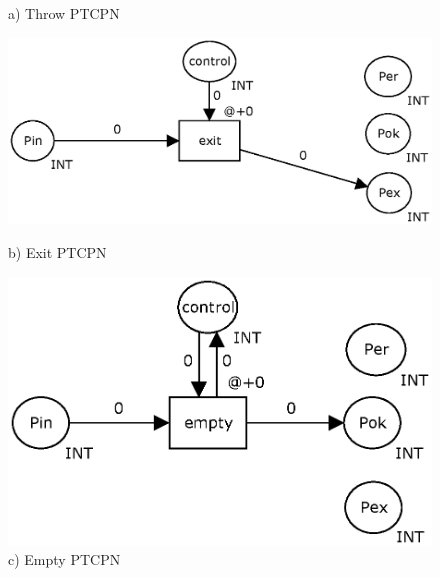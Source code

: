 \begin{itemize}
\begin{figure}[h]
{{\begin{minipage}[c]{0.32\textwidth}
    \caption*{a) Throw PTCPN}
    \label{fig:throw}
\end{minipage}
\begin{minipage}[c]{0.33\textwidth}
\centering
    \includegraphics[scale=0.3]{Figures/exit.eps}
    \caption*{b) Exit PTCPN}
    \label{fig:exit}
\end{minipage}
\begin{minipage}[c]{0.33\textwidth}
\centering
    \includegraphics[scale=0.3]{Figures/empty.eps}
    \vspace{-0.25cm}
    \caption*{c) Empty PTCPN}
    \label{fig:empty}
\end{minipage}

}}
\end{figure}
\end{itemize}
